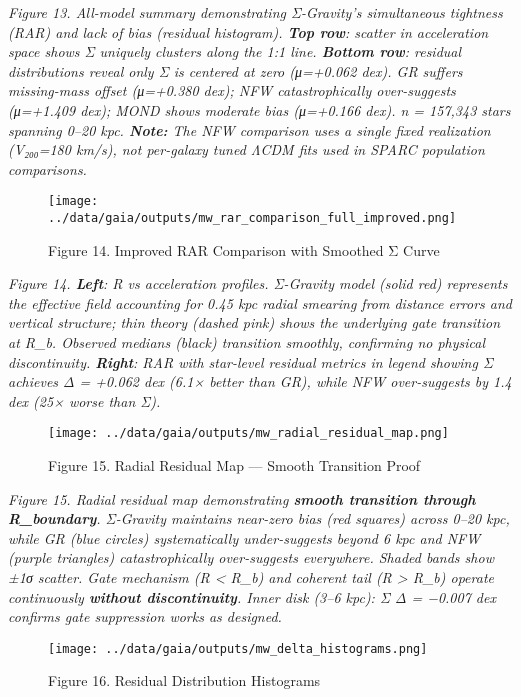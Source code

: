 \documentclass[11pt,a4paper]{article}
\begin{document}
\textit{Figure 13. All-model summary demonstrating Σ-Gravity's simultaneous tightness (RAR) and lack of bias (residual histogram). \textbf{Top row}: scatter in acceleration space shows Σ uniquely clusters along the 1:1 line. \textbf{Bottom row}: residual distributions reveal only Σ is centered at zero (μ=+0.062 dex). GR suffers missing-mass offset (μ=+0.380 dex); NFW catastrophically over-suggests (μ=+1.409 dex); MOND shows moderate bias (μ=+0.166 dex). n = 157,343 stars spanning 0–20 kpc. \textbf{Note:} The NFW comparison uses a single fixed realization (V₂₀₀=180 km/s), not per-galaxy tuned ΛCDM fits used in SPARC population comparisons.}


\begin{figure}[h]
\centering
\texttt{[image: ../data/gaia/outputs/mw\_rar\_comparison\_full\_improved.png]}
\caption{Figure 14. Improved RAR Comparison with Smoothed Σ Curve}
\end{figure}


\textit{Figure 14. \textbf{Left}: R vs acceleration profiles. Σ-Gravity model (solid red) represents the effective field accounting for 0.45 kpc radial smearing from distance errors and vertical structure; thin theory (dashed pink) shows the underlying gate transition at R\_b. Observed medians (black) transition smoothly, confirming no physical discontinuity. \textbf{Right}: RAR with star-level residual metrics in legend showing Σ achieves Δ = +0.062 dex (6.1× better than GR), while NFW over-suggests by 1.4 dex (25× worse than Σ).}


\begin{figure}[h]
\centering
\texttt{[image: ../data/gaia/outputs/mw\_radial\_residual\_map.png]}
\caption{Figure 15. Radial Residual Map — Smooth Transition Proof}
\end{figure}


\textit{Figure 15. Radial residual map demonstrating \textbf{smooth transition through R\_boundary}. Σ-Gravity maintains near-zero bias (red squares) across 0–20 kpc, while GR (blue circles) systematically under-suggests beyond 6 kpc and NFW (purple triangles) catastrophically over-suggests everywhere. Shaded bands show ±1σ scatter. Gate mechanism (R < R\_b) and coherent tail (R > R\_b) operate continuously \textbf{without discontinuity}. Inner disk (3–6 kpc): Σ Δ = −0.007 dex confirms gate suppression works as designed.}


\begin{figure}[h]
\centering
\texttt{[image: ../data/gaia/outputs/mw\_delta\_histograms.png]}
\caption{Figure 16. Residual Distribution Histograms}
\end{figure}
\end{document}
